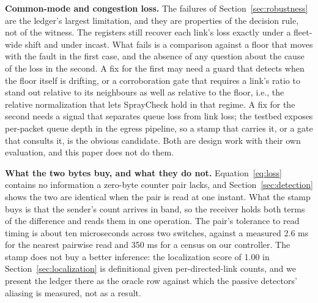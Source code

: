 \textbf{Common-mode and congestion loss.} The failures of Section~\ref{sec:robustness} are the ledger's largest limitation, and they are properties of the decision rule, not of the witness. The registers still recover each link's loss exactly under a fleet-wide shift and under incast. What fails is a comparison against a floor that moves with the fault in the first case, and the absence of any question about the cause of the loss in the second. A fix for the first may need a guard that detects when the floor itself is drifting, or a corroboration gate that requires a link's ratio to stand out relative to its neighbours as well as relative to the floor, i.e., the relative normalization that lets SprayCheck hold in that regime. A fix for the second needs a signal that separates queue loss from link loss; the testbed exposes per-packet queue depth in the egress pipeline, so a stamp that carries it, or a gate that consults it, is the obvious candidate. Both are design work with their own evaluation, and this paper does not do them.

\textbf{What the two bytes buy, and what they do not.} Equation~\eqref{eq:loss} contains no information a zero-byte counter pair lacks, and Section~\ref{sec:detection} shows the two are identical when the pair is read at one instant. What the stamp buys is that the sender's count arrives in band, so the receiver holds both terms of the difference and reads them in one operation. The pair's tolerance to read timing is about ten microseconds across two switches, against a measured 2.6 ms for the nearest pairwise read and 350 ms for a census on our controller. The stamp does not buy a better inference: the localization score of 1.00 in Section~\ref{sec:localization} is definitional given per-directed-link counts, and we present the ledger there as the oracle row against which the passive detectors' aliasing is measured, not as a result.

